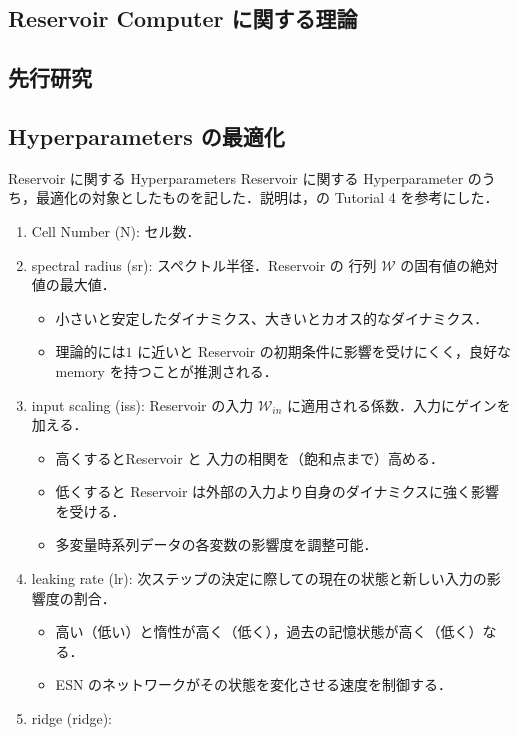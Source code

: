 \subsection{Reservoir Computer に関する理論}
\begin{frame}
    
\end{frame}

\subsection{先行研究}
\begin{frame}
    
\end{frame}

\subsection{Hyperparameters の最適化}
\begin{frame}{Reservoir に関する Hyperparameters}
    Reservoir に関する Hyperparameter のうち，最適化の対象としたものを記した．説明は，\cite{rpy_doc}の Tutorial 4 を参考にした．
    \begin{enumerate}
        \item Cell Number (N): セル数．
        \item spectral radius (sr): スペクトル半径．Reservoir の 行列 $\mathcal{W}$ の固有値の絶対値の最大値．\begin{itemize}
            \item 小さいと安定したダイナミクス、大きいとカオス的なダイナミクス．
            \item 理論的には$1$ に近いと Reservoir の初期条件に影響を受けにくく，良好な memory を持つことが推測される．
        \end{itemize}
        \item input scaling (iss): Reservoir の入力 $\mathcal{W}_{in}$ に適用される係数．入力にゲインを加える．\begin{itemize}
            \item 高くするとReservoir と 入力の相関を（飽和点まで）高める．
            \item 低くすると Reservoir は外部の入力より自身のダイナミクスに強く影響を受ける．
            \item 多変量時系列データの各変数の影響度を調整可能．
        \end{itemize}
        \item leaking rate (lr): 次ステップの決定に際しての現在の状態と新しい入力の影響度の割合．\begin{itemize}
            \item 高い（低い）と惰性が高く（低く），過去の記憶状態が高く（低く）なる．
            \item ESN のネットワークがその状態を変化させる速度を制御する．
        \end{itemize}
        \item ridge (ridge): 
    \end{enumerate}
\end{frame}


